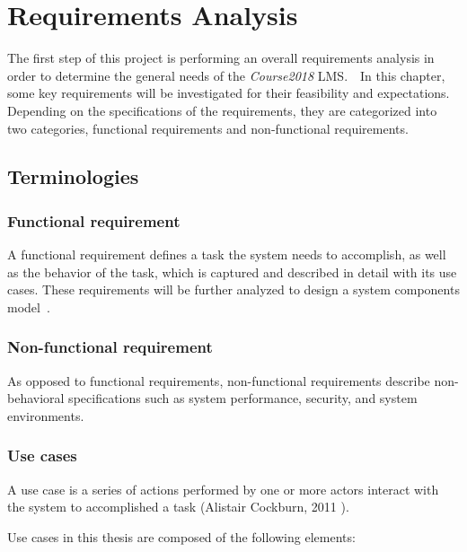 

\chapter{Requirements Analysis}
\label{chap:REQS}

The first step of this project is performing an overall requirements analysis
in order to determine the general needs of the \emph{Course2018} LMS.\ \ 
In this chapter, some key requirements will be investigated for their
feasibility and expectations.
Depending on the specifications of the requirements, they are categorized into
two categories, functional requirements and non-functional requirements.

\section{Terminologies}

\subsection{Functional requirement}
A functional requirement defines a task the system needs to accomplish,
as well as the behavior of the task, which is captured and described in detail
with its use cases.
These requirements will be further analyzed to design a system components
model~\cite{functionalReqs}.

\subsection{Non-functional requirement}
As opposed to functional requirements, non-functional requirements describe
non-behavioral specifications such as system performance, security, and system
environments.

\subsection{Use cases}
A use case is a series of actions performed by one or more actors interact
with the system to accomplished a task
(Alistair Cockburn, 2011 \cite{useCase}).

\medskip 

Use cases in this thesis are composed of the following elements:

